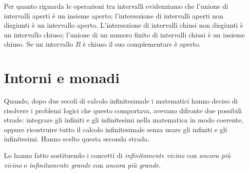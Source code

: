 Per quanto riguarda le operazioni tra intervalli evidenziamo che l'unione 
di intervalli aperti è un insieme aperto; 
l'intersezione di intervalli aperti non disgiunti è un intervallo aperto. 
L'intersezione di intervalli chiusi non disgiunti è un intervallo chiuso; 
l'unione di un numero finito di intervalli chiusi è un insieme chiuso. 
Se un intervallo \(B\) è chiuso il suo complementare è aperto.

\section{Intorni e monadi}
\label{sec:topologiaintorni}

Quando, dopo due secoli di calcolo infinitesimale i matematici hanno deciso di 
risolvere i problemi logici che questo comportava, avevano difronte due 
possibili strade: integrare gli infiniti e gli infinitesimi nella matematica in 
modo coerente, oppure ricostruire tutto il calcolo infinitesimale senza usare 
gli infiniti e gli infinitesimi. 
Hanno scelto questa seconda strada.

Lo hanno fatto sostituendo i concetti di \emph{infinitamente vicino} con 
\emph{ancora più vicino} e \emph{infinitamente grande} con 
\emph{ancora più grande}. 


